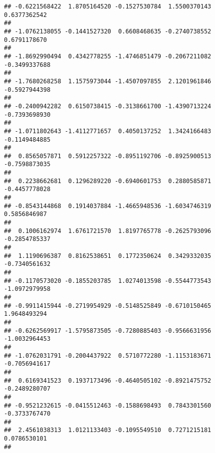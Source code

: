 \documentclass[]{article}
\begin{document}
\begin{verbatim}
## -0.6221568422  1.8705164520 -0.1527530784  1.5500370143  0.6377362542 
##                                                                       
## -1.0762138055 -0.1441527320  0.6608468635 -0.2740738552  0.6791178670 
##                                                                       
## -1.8692990494  0.4342778255 -1.4746851479 -0.2067211082 -0.3499337688 
##                                                                       
## -1.7680268258  1.1575973044 -1.4507097855  2.1201961846 -0.5927944398 
##                                                                       
## -0.2400942282  0.6150738415 -0.3138661700 -1.4390713224 -0.7393698930 
##                                                                       
## -1.0711802643 -1.4112771657  0.4050137252  1.3424166483 -0.1149484885 
##                                                                       
##  0.8565057871  0.5912257322 -0.8951192706 -0.8925900513 -0.7598873035 
##                                                                       
##  0.2238662681  0.1296289220 -0.6940601753  0.2880585871 -0.4457778028 
##                                                                       
## -0.8543144868  0.1914037884 -1.4665948536 -1.6034746319  0.5856846987 
##                                                                       
##  0.1006162974  1.6761721570  1.8197765778 -0.2625793096 -0.2854785337 
##                                                                       
##  1.1190696387  0.8162538651  0.1772350624  0.3429332035 -0.7340561632 
##                                                                       
## -0.1170573020 -0.1855203785  1.0274013598 -0.5544773543 -1.0972979958 
##                                                                       
## -0.9911415944 -0.2719954929 -0.5148525849 -0.6710150465  1.9648493294 
##                                                                       
## -0.6262569917 -1.5795873505 -0.7280885403 -0.9566631956 -1.0032964453 
##                                                                       
## -1.0762031791 -0.2004437922  0.5710772280 -1.1153183671 -0.7056941617 
##                                                                       
##  0.6169341523  0.1937173496 -0.4640505102 -0.8921475752 -0.2489280707 
##                                                                       
## -0.9521232615 -0.0415512463 -0.1588698493  0.7843301560 -0.3733767470 
##                                                                       
##  2.4561038313  1.0121133403 -0.1095549510  0.7271215181  0.0786530101 
##                                                                       

\end{verbatim}
\end{document}
